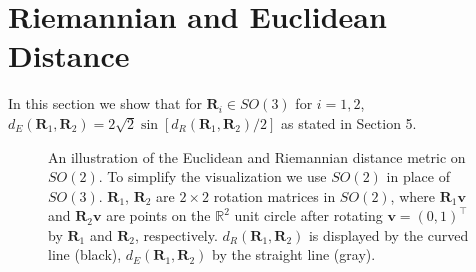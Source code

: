 \documentclass[12pt]{article}
\newcommand{\Rdist}{{d_R}}
\newcommand{\Edist}{{d_E}}
\begin{document}
\setcounter{table}{4}
\setcounter{figure}{9}
\appendix

\section{Riemannian and Euclidean Distance}
\label{sec:appendix2}
In this section we show that for $\bm R_i\in SO(3)$ for $i=1,2$, $\Edist(\bm R_1,\bm R_2)=2\sqrt{2}\sin[\Rdist(\bm R_1,\bm R_2)/2]$ as stated in Section 5.

\begin{figure}[h!]
\begin{center}
\end{center}
\vspace{-.25cm}
\caption{An illustration of the Euclidean and Riemannian distance metric on $SO(2)$. To simplify the visualization we use $SO(2)$ in place of $SO(3)$.   $\bm R_1$, $\bm R_2$ are $2\times2$ rotation matrices in $SO(2)$, where $\bm R_1\bm v$ and $\bm R_2\bm v$ are points on the $\mathbb R^2$ unit circle after rotating $\bm v = (0,1)^{\top}$ by  $\bm R_1$ and $\bm R_2$, respectively.  $\Rdist (\bm R_1,\bm R_2)$ is displayed by the curved line (black), $\Edist (\bm R_1,\bm R_2)$ by the straight line (gray).}
\label{fig:dEvsdG2} 
\end{figure}
\end{document}
